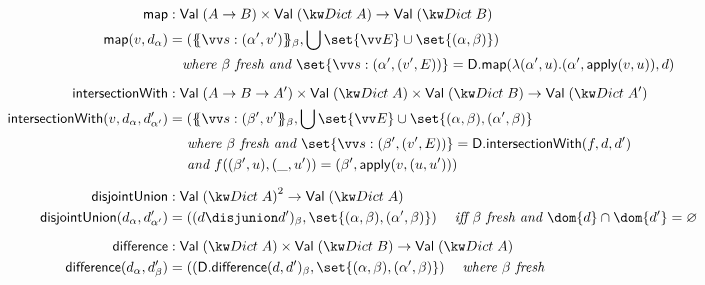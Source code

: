 \begin{figure}
\small
\addtolength{\jot}{-0.4em}
\begin{align*}
   \dictMap &: \Val{(\tyFun{A}{B})} \times \Val{(\tyDict{A})} \to \Val{(\tyDict{B})}
   \\
   \dictMap(v, d_{\alpha})
   &=
   (\annDict{\seq{\bind{s}{(\alpha', v')}}}{\beta}, \bigcup\set{\seq{E}} \cup \set{(\alpha, \beta)})
   \\
   &\quad\textit{where }\beta\textit{ fresh and }
   \set{\seq{\bind{s}{(\alpha', (v',E))}}} = \Dmap(\lambda(\alpha', u).(\alpha', \apply(v, u)), d)
   \\[2mm]
   \dictIntersectionWith
   &:
   \Val{(\tyFun{A}{\tyFun{B}{A'}})} \times \Val{(\tyDict{A})} \times \Val{(\tyDict{B})} \to \Val{(\tyDict{A'})}
   \\
   \dictIntersectionWith(v, d_{\alpha}, d'_{\alpha'})
   &=
    (\annDict{\seq{\bind{s}{(\beta', v'}}}{\beta},
    \bigcup\set{\seq{E}} \cup \set{(\alpha, \beta), (\alpha', \beta)}
   \\
   &\quad\textit{ where }\beta\textit{ fresh and }
   \set{\seq{\bind{s}{(\beta', (v',E))}}} = \DintersectionWith(f, d, d')
   \\
   &\quad\textit{ and }
   f((\beta', u), (\_, u')) = (\beta', \apply(v, (u, u')))
   \\[2mm]
   \dictDisjUnion &: \Val{(\tyDict{A})}^2 \to \Val{(\tyDict{A})}
   \\
   \dictDisjUnion(d_{\alpha}, d'_{\alpha'})
   &=
   ((d \disjunion d')_{\beta}, \set{(\alpha, \beta), (\alpha', \beta)})
   \quad\;\textit{iff }\beta\textit{ fresh and }\dom{d} \cap \dom{d'} = \varnothing
   \\[2mm]
   \dictDifference &: \Val{(\tyDict{A})} \times \Val{(\tyDict{B})} \to \Val{(\tyDict{A})}
   \\
   \dictDifference(d_{\alpha}, d'_{\beta})
   &=
   ((\Ddifference(d, d')_{\beta}, \set{(\alpha, \beta), (\alpha', \beta)})
   \quad\;\textit{where }\beta\textit{ fresh}
   \\[2mm]

\end{align*}
\end{figure}
